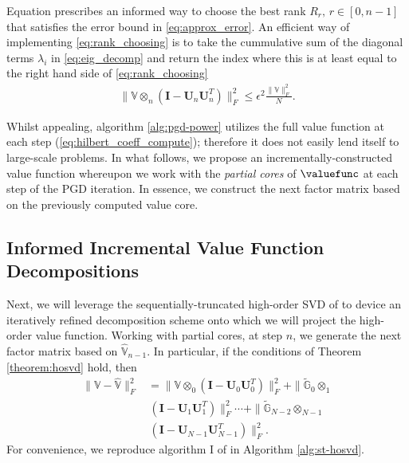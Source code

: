 Equation prescribes an informed way to choose the best rank $R_r, \, r \in [0, n-1]$ that satisfies the error bound in  \eqref{eq:approx_error}. An efficient way of implementing \eqref{eq:rank_choosing} is to take the cummulative sum of the diagonal terms $\lambda_i$ in  \eqref{eq:eig_decomp} and return the index where this is at least equal to the right hand side of \eqref{eq:rank_choosing}
%
\begin{align}
	\| \mathds{V} \otimes_{n} \left(\mathbf{I} - \mathbf{U}_n \mathbf{U}_n^T\right) \|_F^2 \le \epsilon^2 \frac{ \| \mathds{V}\|_F^2}{N}.
\end{align}
%


Whilst appealing, algorithm \ref{alg:pgd-power} utilizes the full value function at each step (\cf \eqref{eq:hilbert_coeff_compute}); therefore it does not easily lend itself to large-scale problems. In what follows, we propose an incrementally-constructed value function whereupon we work with the \textit{partial cores} of $\valuefunc$ at each step of the PGD iteration. In essence, we construct the next factor matrix based on the previously computed value core. 


\subsection{Informed Incremental Value Function Decompositions}
\label{subsec:inc_hosvd}

Next, we will leverage the sequentially-truncated high-order SVD of \cite{VannieuwenhovenTruncate2012} to device an iteratively refined decomposition scheme onto which we will project the high-order value function. Working with partial cores, at step $n$, we generate the next factor matrix based on $\mathds{\hat{V}}_{n-1}$. In particular, if the conditions of Theorem \ref{theorem:hosvd} hold, then
%
\begin{align}
	\|\mathds{V} - \mathds{\hat{V}}\|_F^2 &=  \| \mathds{V} \otimes_0 \left( \mathbf{I} - \mathbf{U}_0 \mathbf{U}_0^T \right)\|_F^2 +  \| \mathds{\tilde{G}}_0 \otimes_1   \nonumber \\
	& \, \left( \mathbf{I} - \mathbf{U}_1 \mathbf{U}_1^T \right)\|_F^2 \cdots  + \| \mathds{\tilde{G}}_{N-2} \otimes_{N-1} \nonumber \\
	& \, \left( \mathbf{I} - \mathbf{U}_{N-1} \mathbf{U}_{N-1}^T \right)\|_F^2.
\end{align}
%
For convenience, we reproduce algorithm I of \cite{VannieuwenhovenTruncate2012} in Algorithm \ref{alg:st-hosvd}.

